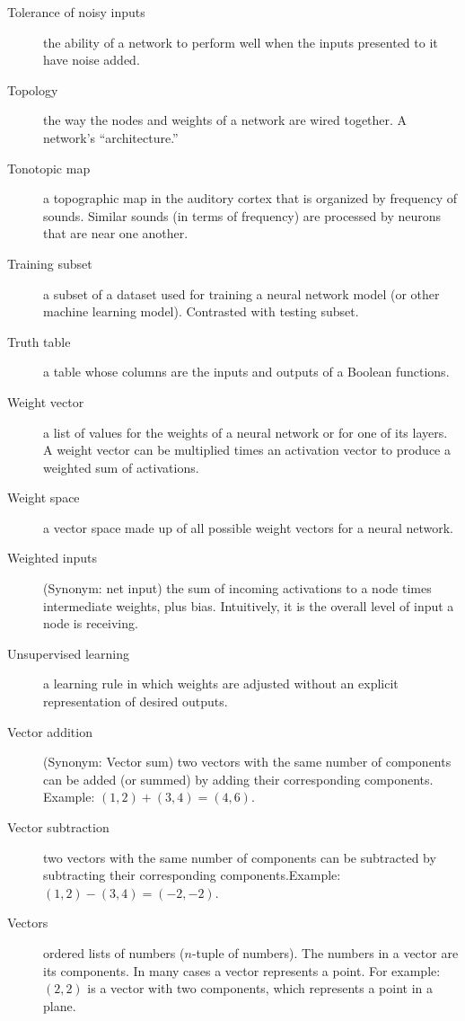 \begin{description}
\item[Tolerance of noisy inputs] the ability of a network to perform well when the inputs presented to it have noise added.

\item[Topology] the way the nodes and weights of a network are wired together. A network's ``architecture.''

\item[Tonotopic map] a topographic map in the auditory cortex that is organized by frequency of sounds. Similar sounds (in terms of frequency) are processed by neurons that are near one another.

\item[Training subset] a subset of a dataset used for training a neural network model (or other machine learning model). Contrasted with testing subset.

\item[Truth table] a table whose columns are the inputs and outputs of a Boolean functions.

\item[Weight vector] a list of values for the weights of a neural network or for one of its layers. A weight vector can be multiplied times an activation vector to produce a weighted sum of activations.

\item[Weight space] a vector space made up of all possible weight vectors for a neural network.

\item[Weighted inputs] (Synonym: net input) the sum of incoming activations to a node times intermediate weights, plus bias. Intuitively, it is the overall level of input a node is receiving.

\item[Unsupervised learning] a learning rule in which weights are adjusted without an explicit representation of desired outputs.

\item[Vector addition] (Synonym: Vector sum) two vectors with the same number of components can be added (or summed) by adding their corresponding components. Example: $(1,2) + (3,4) = (4,6)$.

\item[Vector subtraction] two vectors with the same number of components can be subtracted by subtracting their corresponding components.Example: $(1,2) - (3,4) = (-2,-2)$.

\item[Vectors] ordered lists of numbers ($n$-tuple of numbers). The numbers in a vector are its components. In many cases a vector represents a point. For example: $(2,2)$ is a vector with two components, which represents a point in a plane.


\end{description}
